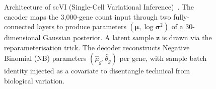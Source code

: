 \begin{figure}[ht]
\caption{Architecture of scVI (Single-Cell Variational Inference)~\cite{lopez2018deep}. The encoder maps the 3,000-gene count input through two fully-connected layers to produce parameters $(\boldsymbol{\mu}, \log\boldsymbol{\sigma}^2)$ of a 30-dimensional Gaussian posterior. A latent sample $\mathbf{z}$ is drawn via the reparameterisation trick. The decoder reconstructs Negative Binomial (NB) parameters $(\hat{\mu}_g, \hat{\theta}_g)$ per gene, with sample batch identity injected as a covariate to disentangle technical from biological variation.}
\label{fig:scvi_arch}
\end{figure}
